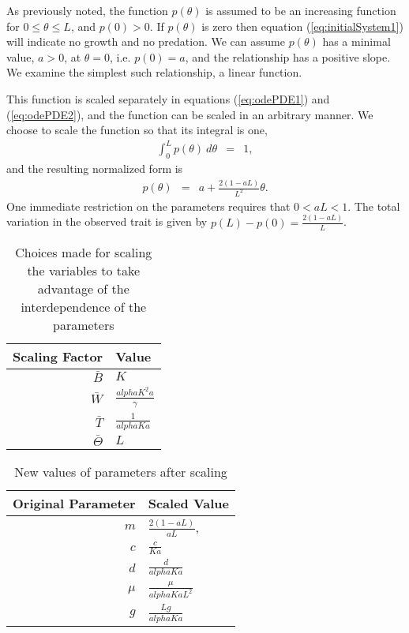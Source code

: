 \documentclass[review,authoryear]{elsarticle}
\def\alpha{alpha}%
\newcommand{\origAlpha}{{\alpha}}
\newcommand{\origK}{{K}}
\newcommand{\origGamma}{{\gamma}}
\newcommand{\origA}{{a}}
\newcommand{\origC}{{c}}
\newcommand{\origD}{{d}}
\newcommand{\origG}{{g}}
\newcommand{\origL}{{L}}
\newcommand{\origP}[1]{{p}(#1)}
\newcommand{\origTheta}{{\theta}}
\newcommand{\origMu}{{\mu}}
\begin{document}
As previously noted, the function $\origP{\origTheta}$ is assumed to be an
increasing function for $0\leq\origTheta\leq \origL$, and $\origP{0}>0$. If
$\origP{\origTheta}$ is zero then equation (\ref{eq:initialSystem1}) will
indicate no growth and no predation. We can assume $\origP{\origTheta}$ has a
minimal value, $a>0$,  at $\origTheta = 0$, i.e. $\origP{0}=a$, and the relationship has a positive slope. We
examine the simplest such relationship, a linear function.

This function is scaled separately in equations (\ref{eq:odePDE1}) and
(\ref{eq:odePDE2}), and the function can be scaled in an arbitrary
manner. We choose to scale the function so that its integral is one,
\begin{eqnarray*}
  \int^{\origL}_0 \origP{\origTheta} ~ d\origTheta & = & 1,
\end{eqnarray*}
and the resulting normalized form is
\begin{eqnarray}
  \label{eq:linearFormP}
  \origP{\origTheta} & = & \origA + \frac{2(1-\origA\origL)}{\origL^2} \origTheta.
\end{eqnarray}
One immediate restriction on the parameters requires that
$0<\origA\origL<1$. The total variation in the observed trait is given by 
$\origP{\origL} - \origP{0} =\frac{2(1-\origA\origL)}{\origL}$.

\begin{table}[h]
  \centering
  \begin{tabular}{r|l}
    Scaling Factor & Value \\ \hline
    $\bar{B}$ & $\origK$ \\ [10pt]
    $\bar{W}$ & $\frac{\origAlpha \origK^2 \origA}{\origGamma}$ \\  [10pt]
    $\bar{T}$ & $\frac{1}{\origAlpha \origK \origA}$ \\  [10pt]
    $\bar{\Theta}$ & $\origL$
  \end{tabular}
  \caption{Choices made for scaling the variables to take advantage of the interdependence of the parameters}
  \label{tab:scalingChoices}
\end{table}

\begin{table}[h]
  \centering
  \begin{tabular}{r|l}
  Original Parameter & Scaled Value \\ \hline
    $m$   & $\frac{2(1-\origA\origL)}{\origA\origL}$, \\  [10pt]
    $c$   & $\frac{\origC}{\origK\origA}$ \\  [10pt]
    $d$   & $\frac{\origD}{\origAlpha\origK\origA}$ \\  [10pt]
    $\mu$ & $\frac{\origMu}{\origAlpha\origK\origA\origL^2}$  \\  [10pt]
    $g$   & $\frac{\origL\origG}{\origAlpha\origK\origA}$
  \end{tabular}
  \caption{New values of parameters after scaling}
  \label{tab:newParameters}
\end{table}
\end{document}
